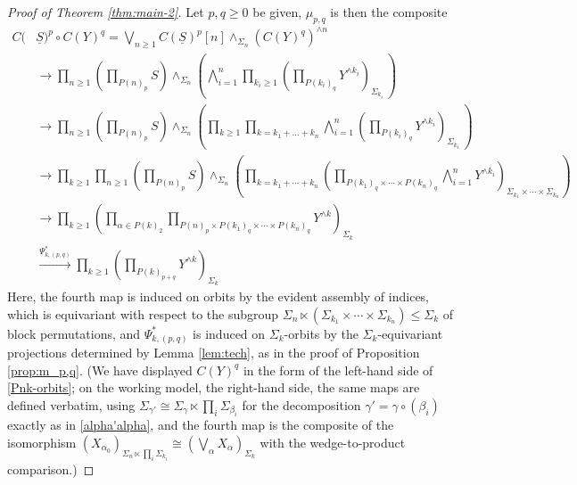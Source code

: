 \documentclass[12pt]{amsart}
\theoremstyle{definition}
\theoremstyle{remark}
\newcommand{\uS}{\underline{S}}
\begin{document}
\begin{proof}[Proof of Theorem \ref{thm:main-2}]
Let $p,q\geq 0$ be given, $\mu_{p,q}$ is then the composite
\begingroup\allowdisplaybreaks
\begin{align*}
         C(&\uS)^p \circ C(Y)^q  = \bigvee_{n\geq 1} C(\uS)^p[n] \wedge_{\Sigma_n} (C(Y)^q)^{\wedge n} \\
         & \to \prod_{n\geq 1} \left( \prod_{P(n)_p} S \right) \wedge_{\Sigma_n} \left( \bigwedge_{i=1}^n \prod_{k_i\geq 1}\left(  \prod_{P(k_i)_q} Y^{\wedge k_i} \right)_{\Sigma_{k_i}} \, \right)
         \\
         & \to \prod_{n\geq 1} \left( \prod_{P(n)_p} S \right) \wedge_{\Sigma_n} \left( \prod_{k\geq 1} \prod_{k=k_1+\dots+k_n} \bigwedge_{i=1}^n \left( \prod_{P(k_i)_q} Y^{\wedge k_i} \right)_{\Sigma_{k_i}} \, \right)
         \\
         & \to \prod_{k\geq 1} \prod_{n\geq 1}  \left(\prod_{P(n)_p} S\right) \wedge_{\Sigma_n} \left( \prod_{k=k_1+\cdots+k_n} \left(\prod_{P(k_1)_q\times \cdots \times P(k_n)_q} \bigwedge_{i=1}^n Y^{\wedge k_i}\right)_{\Sigma_{k_1}\times \cdots \times \Sigma_{k_n}}\right)
         \\
         & \to \prod_{k\geq 1}  \left(  \prod_{\alpha\in P(k)_2} \prod_{P(n)_p\times P(k_1)_q\times \cdots \times P(k_n)_q}  Y^{\wedge k}\right)_{\Sigma_k} \\
         & \xrightarrow{\Psi_{k,(p,q)}^*} \prod_{k \geq 1} \left( \prod_{P(k)_{p+q}} Y^{\wedge k} \right)_{\Sigma_k}
    \end{align*}\endgroup
    Here, the fourth map is induced on orbits by the evident assembly of indices, which is equivariant with respect to the subgroup $\Sigma_n\ltimes(\Sigma_{k_1}\times \cdots \times \Sigma_{k_n})\leq \Sigma_k$ of block permutations, and $\Psi^*_{k,(p,q)}$ is induced on $\Sigma_k$-orbits by the $\Sigma_k$-equivariant projections determined by Lemma \ref{lem:tech}, as in the proof of Proposition \ref{prop:m_p,q}. (We have displayed $C(Y)^q$ in the form of the left-hand side of \eqref{Pnk-orbits}; on the working model, the right-hand side, the same maps are defined verbatim, using $\Sigma_{\gamma'}\cong \Sigma_{\gamma}\ltimes\prod_i \Sigma_{\beta_i}$ for the decomposition $\gamma' = \gamma\circ(\beta_i)$ exactly as in \eqref{alpha'alpha}, and the fourth map is the composite of the isomorphism $(X_{\alpha_0})_{\Sigma_n\ltimes\prod_i\Sigma_{k_i}}\cong (\bigvee_{\alpha} X_{\alpha})_{\Sigma_k}$ with the wedge-to-product comparison.)


\end{proof}
\end{document}
